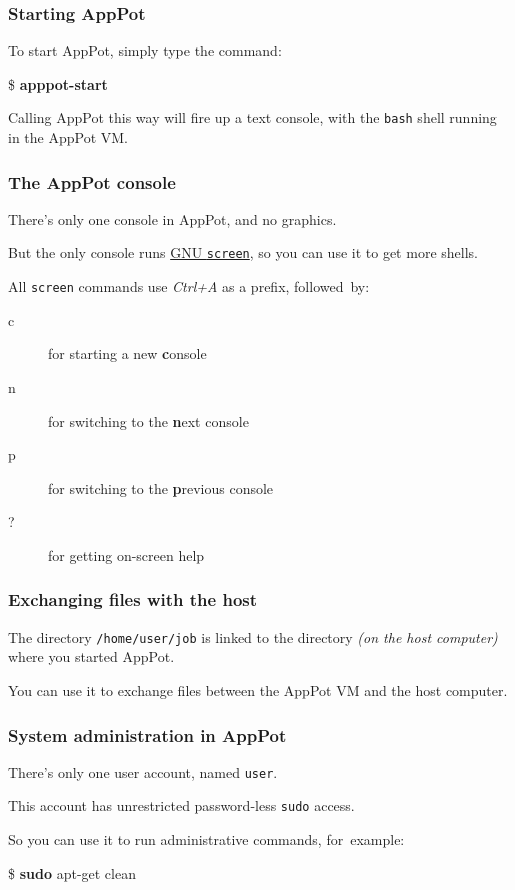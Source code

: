 \documentclass[english,serif,mathserif,xcolor=pdftex,dvipsnames,table]{beamer}
\newcommand{\+}{\largeskip}
\begin{document}
\begin{frame}
  \frametitle{Starting AppPot}
  To start AppPot, simply type the command:
\begin{semiverbatim}
\$ \textbf{apppot-start}
\end{semiverbatim}

  \+ Calling AppPot this way will fire up a text console, with the
  \texttt{bash} shell running in the AppPot VM.
\end{frame}

\begin{frame}
  \frametitle{The AppPot console}
  There's only one console in AppPot, and no graphics.

  \+
  But the only console runs \href{http://www.gnu.org/s/screen/}{GNU
    \texttt{screen}}, so you can use it to get more shells.

  \+
  All \texttt{screen} commands use \textsl{\color{uzh@blue} Ctrl+A} as a prefix,
  followed~by:
  \begin{description}
  \item[c] for starting a new \textbf{c}onsole
  \item[n] for switching to the \textbf{n}ext console
  \item[p] for switching to the \textbf{p}revious console
  \item[?] for getting on-screen help
  \end{description}
\end{frame}


\begin{frame}
  \frametitle{Exchanging files with the host}
  The directory \texttt{/home/user/job} is linked to the directory
  \emph{(on the host computer)} where you started AppPot.

  \+ 
  You can use it to exchange files between the AppPot VM and the
  host computer.
\end{frame}

\begin{frame}[fragile]
  \frametitle{System administration in AppPot}
  There's only one user account, named \texttt{user}.

  \+
  This account has unrestricted password-less \texttt{sudo} access. 

  \+
  So you can use it to run administrative commands, 
  for~example:
\begin{semiverbatim}
\$ \textbf{sudo} apt-get clean
\end{semiverbatim}
\end{frame}
\end{document}
